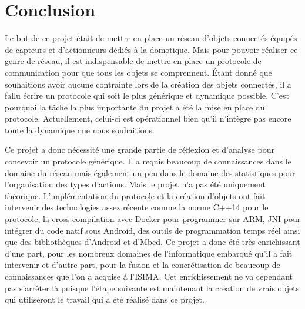 \chapter*{Conclusion}

Le but de ce projet était de mettre en place un réseau d'objets connectés équipés de capteurs et
d'actionneurs dédiés à la domotique. Mais pour pouvoir réaliser ce genre de réseau, il est 
indispensable de mettre en place un protocole de communication pour que tous les objets se
comprennent. Étant donné que souhaitions avoir aucune contrainte lors de la création des objets
connectés, il a fallu écrire un protocole qui soit le plus générique et dynamique possible. C'est
pourquoi la tâche la plus importante du projet a été la mise en place du protocole.
Actuellement, celui-ci est opérationnel bien qu'il n'intègre pas encore toute la dynamique que
nous souhaitions.

Ce projet a donc nécessité une grande partie de réflexion et d'analyse pour concevoir un protocole 
générique. Il a requis beaucoup de connaissances dans le domaine du réseau mais également un peu
dans le domaine des statistiques pour l'organisation des types d'actions. Mais le projet n'a pas été
uniquement théorique. L'implémentation du protocole et la création d'objets ont fait intervenir des
technologies assez récente comme la norme C++14 pour le protocole, la cross-compilation avec Docker 
pour programmer sur ARM, JNI pour intégrer du code natif sous Android, des outils de programmation
temps réel ainsi que des bibliothèques d'Android et d'Mbed. Ce projet a donc été très enrichissant 
d'une part, pour les nombreux domaines de l'informatique embarqué qu'il a fait intervenir et d'autre
part, pour la fusion et la concrétisation de beaucoup de connaissances que l'on a acquise à l'ISIMA.
Cet enrichissement ne va cependant pas s'arrêter là puisque l'étape suivante est maintenant la 
création de vrais objets qui utiliseront le travail qui a été réalisé dans ce projet.

